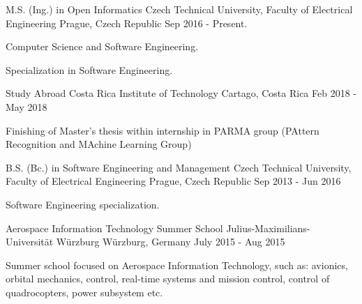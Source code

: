 \begin{cventries}
  \cventry
    {M.S. (Ing.) in Open Informatics}
    {Czech Technical University, Faculty of Electrical Engineering}
    {Prague, Czech Republic}
    {Sep 2016 - Present.}
    {
      \begin{cvitems}
        \item {Computer Science and Software Engineering.}
        \item {Specialization in Software Engineering.}
      \end{cvitems}
    }

    \cventry
    {Study Abroad}
    {Costa Rica Institute of Technology}
    {Cartago, Costa Rica}
    {Feb 2018 - May 2018}
    {
      \begin{cvitems}
        \item {Finishing of Master's thesis within internship in PARMA group (PAttern Recognition and MAchine Learning Group)}
      \end{cvitems}
    }

  \cventry
    {B.S. (Bc.) in Software Engineering and Management}
    {Czech Technical University, Faculty of Electrical Engineering}
    {Prague, Czech Republic}
    {Sep 2013 - Jun 2016}
    {
      \begin{cvitems}
        \item {Software Engineering specialization.}
      \end{cvitems}
    }

  \cventry
    {Aerospace Information Technology Summer School}
    {Julius-Maximilians-Universität Würzburg}
    {Würzburg, Germany}
    {July 2015 - Aug 2015}
     {
      \begin{cvitems}
        \item {Summer school focused on Aerospace Information Technology, such as: avionics, orbital mechanics, control, real-time systems and mission control, control of quadrocopters, power subsystem etc.}
      \end{cvitems}
    }
\end{cventries}
